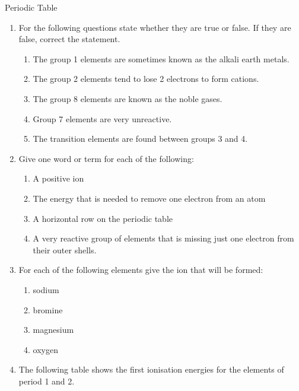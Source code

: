 \begin{eocexercises}{ Periodic Table}
            \nopagebreak
            \label{m38757*uid091221}\begin{enumerate}[noitemsep, label=\textbf{\arabic*}. ] 
            \item For the following questions state whether they are true or false. If they are false, correct the statement. \label{m38757*id073324}\begin{enumerate}[noitemsep, label=\textbf{\alph*}. ] 
            \item The group 1 elements are sometimes known as the alkali earth metals.
\item The group 2 elements tend to lose 2 electrons to form cations.
\item The group 8 elements are known as the noble gases.\item Group 7 elements are very unreactive.\item The transition elements are found between groups 3 and 4.\end{enumerate}
\item Give one word or term for each of the following:
\label{m38757*id0734}\begin{enumerate}[noitemsep, label=\textbf{\alph*}. ] 
            \item A positive ion
\item The energy that is needed to remove one electron from an atom\item A horizontal row on the periodic table\item A very reactive group of elements that is missing just one electron from their outer shells.\end{enumerate}
\item For each of the following elements give the ion that will be formed:
\label{m38757*id07324}\begin{enumerate}[noitemsep, label=\textbf{\alph*}. ] 
            \item sodium
\item bromine
\item magnesium
\item oxygen
\end{enumerate}
\label{m38757*uid222}\item The following table shows the first ionisation energies for the elements of period 1 and 2.
 \begin{center} 
\begin{tabular}{|c|c|c|} \hline 

\end{tabular}
\end{center}
\end{enumerate}
\end{eocexercises}
